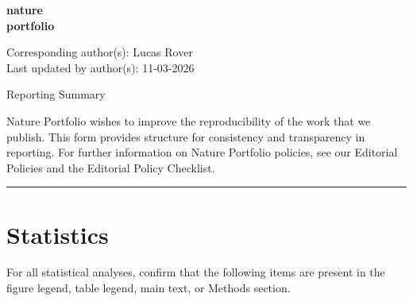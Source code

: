 \documentclass[11pt]{article}
\begin{document}
\begin{flushright}
{\large\bfseries\color{black!70} nature\\portfolio}
\end{flushright}

\noindent Corresponding author(s): Lucas Rover\\
Last updated by author(s): 11-03-2026

\begin{center}
{\LARGE Reporting Summary}
\end{center}

\noindent Nature Portfolio wishes to improve the reproducibility of the work that we publish. This form provides structure for consistency and transparency in reporting. For further information on Nature Portfolio policies, see our Editorial Policies and the Editorial Policy Checklist.

\bigskip
\hrule
\bigskip

\section*{Statistics}

\noindent For all statistical analyses, confirm that the following items are present in the figure legend, table legend, main text, or Methods section.

\medskip
\end{document}
